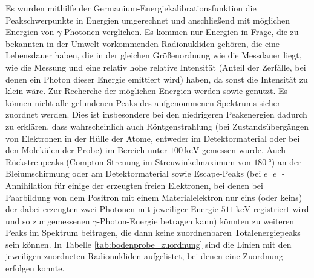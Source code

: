 Es wurden mithilfe der Germanium-Energiekalibrationsfunktion die Peakschwerpunkte in Energien umgerechnet und anschließend mit möglichen Energien von $\gamma$-Photonen verglichen. Es kommen nur Energien in Frage, die zu bekannten in der Umwelt vorkommenden Radionukliden gehören, die eine Lebensdauer haben, die in der gleichen Größenordnung wie die Messdauer liegt, wie die Messung und eine relativ hohe relative Intensität (Anteil der Zerfälle, bei denen ein Photon dieser Energie emittiert wird) haben, da sonst die Intensität zu klein wäre. Zur Recherche der möglichen Energien werden \cite{nudat} sowie \cite[Anhang A]{list_bmumwelt} genutzt. Es können nicht alle gefundenen Peaks des aufgenommenen Spektrums sicher zuordnet werden. Dies ist insbesondere bei den niedrigeren Peakenergien dadurch zu erklären, dass wahrscheinlich auch Röntgenstrahlung (bei Zustandsübergängen von Elektronen in der Hülle der Atome, entweder im Detektormaterial oder bei den Molekülen der Probe) im Bereich unter $\SI{100}{\kilo\eV}$ gemessen wurde.
Auch Rückstreupeaks (Compton-Streuung im Streuwinkelmaximum von $\SI{180}{\degree}$) an der Bleiumschirmung oder am Detektormaterial sowie Escape-Peaks (bei $e^{+}e^{-}$-Annihilation für einige der erzeugten freien Elektronen, bei denen bei Paarbildung von dem Positron mit einem Materialelektron nur eins (oder keins) der dabei erzeugten zwei Photonen mit jeweiliger Energie $\SI{511}{\kilo\eV}$ registriert wird und so zur gemessenen $\gamma$-Photon-Energie betragen kann) könnten zu weiteren Peaks im Spektrum beitragen, die dann keine zuordnenbaren Totalenergiepeaks sein können.
In Tabelle \ref{tab:bodenprobe_zuordnung} sind die Linien mit den jeweiligen zuordneten Radionukliden aufgelistet, bei denen eine Zuordnung erfolgen konnte.


